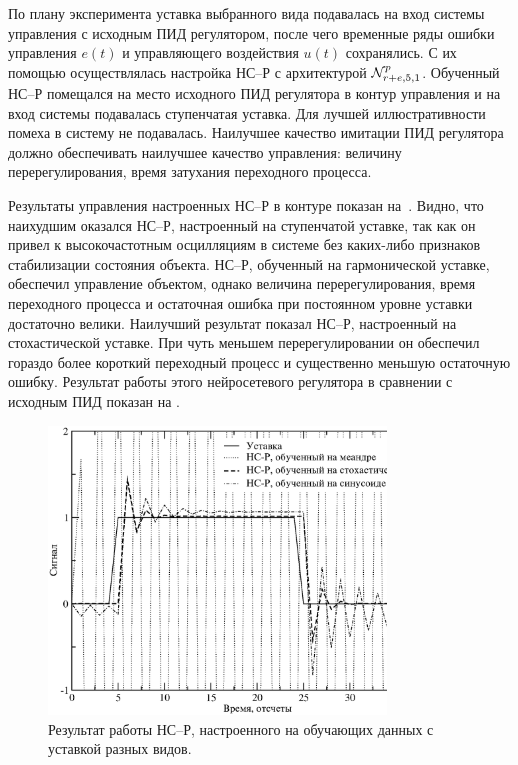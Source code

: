 По плану эксперимента уставка выбранного вида подавалась на вход
системы управления с исходным ПИД регулятором, после чего временные
ряды ошибки управления $e(t)$ и управляющего воздействия $u(t)$
сохранялись.  С их помощью осуществлялась настройка НС--Р с
архитектурой $\mathcal{N}^p_{r+e,5,1}$.  Обученный НС--Р помещался на место
исходного ПИД регулятора в контур управления и на вход системы
подавалась ступенчатая уставка.  Для лучшей иллюстративности помеха в
систему не подавалась.  Наилучшее качество имитации ПИД регулятора
должно обеспечивать наилучшее качество управления: величину
перерегулирования, время затухания переходного процесса.

Результаты управления настроенных НС--Р в контуре показан
на~.  Видно, что наихудшим оказался
НС--Р, настроенный на ступенчатой уставке, так как он привел к
высокочастотным осцилляциям в системе без каких-либо признаков
стабилизации состояния объекта.  НС--Р, обученный на гармонической
уставке, обеспечил управление объектом, однако величина
перерегулирования, время переходного процесса и остаточная ошибка при
постоянном уровне уставки достаточно велики.  Наилучший результат
показал НС--Р, настроенный на стохастической уставке.  При чуть
меньшем перерегулировании он обеспечил гораздо более короткий
переходный процесс и существенно меньшую остаточную ошибку.  Результат
работы этого нейросетевого регулятора в сравнении с исходным ПИД
показан на .

\begin{figure}
\centering
\includegraphics[width=0.8\textwidth,%
  totalheight=0.35\textheight]{nnc_system_response_rus}
\caption{Результат работы НС--Р, настроенного на обучающих данных с уставкой
         разных видов.}\label{fig:nnc_system_response}
\end{figure}

